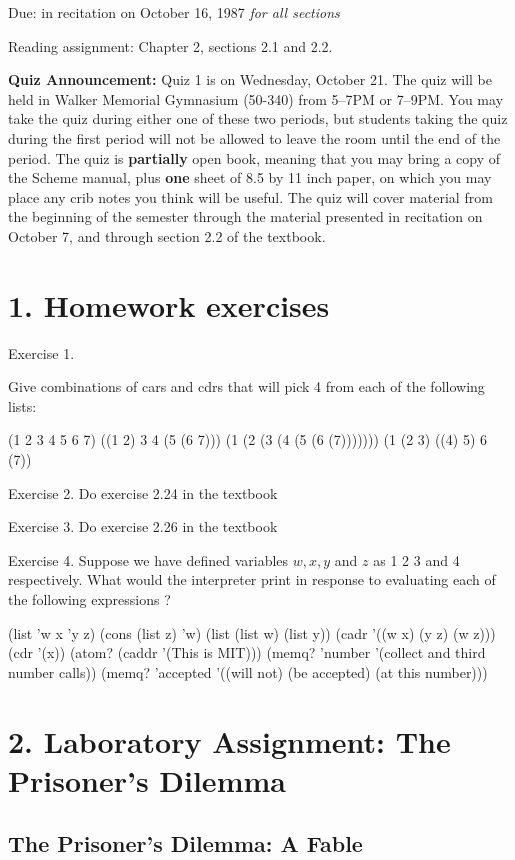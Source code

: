 \vpar
Due: in recitation on October 16, 1987 {\it for all sections}


\vpar
Reading assignment: Chapter 2, sections 2.1 and 2.2.

\vskip 20pt

{\bf Quiz Announcement:}  Quiz 1 is on Wednesday, October 21.  The quiz
will be held in Walker Memorial Gymnasium (50-340) from 5--7PM or
7--9PM.  You may take the quiz during either one of these two periods,
but students taking the quiz during the first period will not be allowed
to leave the room until the end of the period.  The quiz is {\bf
partially} open book, meaning that you may bring a copy of the Scheme
manual, plus {\bf one} sheet of 8.5 by 11 inch paper, on which you may
place any crib notes you think will be useful.  The quiz will cover
material from the beginning of the semester through the material
presented in recitation on October 7, and through section 2.2 
of the textbook.  

\chapter{1. Homework exercises}


\vpar
Exercise 1.

Give combinations of cars and cdrs that will pick 4 from each of
the following lists:

\beginlisp
(1 2 3 4 5 6 7)
((1 2) 3 4 (5 (6 7)))
(1 (2 (3 (4 (5 (6 (7)))))))
(1 (2 3) ((4) 5) 6 (7))
\endlisp

\vpar
Exercise 2.
Do exercise 2.24 in the textbook

\vpar
Exercise 3.
Do exercise 2.26 in the textbook

\vpar
Exercise 4.
Suppose we have defined variables $w, x, y$ and $z$ as 1 2 3 and 4
respectively.  What would the interpreter print in response to
evaluating each of the following expressions ?

\beginlisp
(list 'w x 'y z)
(cons (list z) 'w)
(list (list w) (list y))
(cadr '((w x) (y z) (w z)))
(cdr '(x))
(atom? (caddr '(This is MIT)))
(memq? 'number '(collect and third number calls))
(memq? 'accepted '((will not) (be accepted) (at this number)))
\endlisp

\chapter{2. Laboratory Assignment: The Prisoner's Dilemma}

\section{The Prisoner's Dilemma: A Fable}


